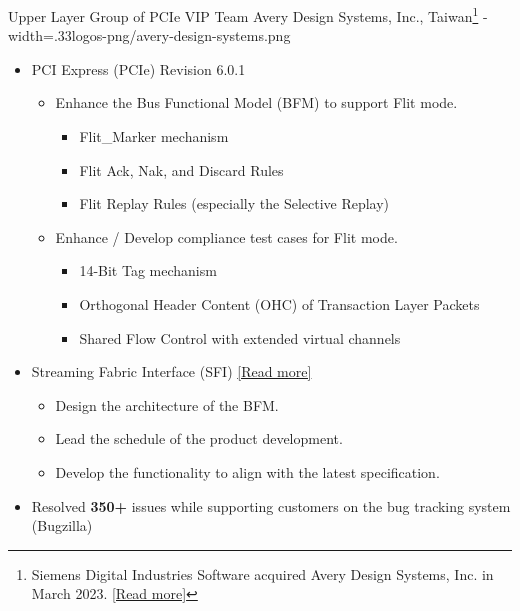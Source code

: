 \documentclass{cvclass}
\newcommand{\simplemmyy}[3]{\shortmmyyformat\formatdate{#3}{#2}{#1}}
\begin{document}
    {Upper Layer Group of PCIe VIP Team}
    {Avery Design Systems, Inc., Taiwan\footnote{Siemens Digital Industries Software acquired Avery Design Systems, Inc. in March 2023. \href{https://newsroom.sw.siemens.com/en-US/siemens-avery-design-systems/}{[Read more]}}}
    {\simplemmyy{2021}{7}{19} - \simplemmyy{2023}{4}{10}}
    {width=.33\linewidth}{logos-png/avery-design-systems.png}
    {\begin{itemize}
        \item PCI Express\textsuperscript{\tiny\textregistered} (PCIe) Revision 6.0.1
        \begin{itemize}
            \item Enhance the Bus Functional Model (BFM) to support Flit mode.
            \begin{itemize}
                \item Flit\_Marker mechanism
                \item Flit Ack, Nak, and Discard Rules
                \item Flit Replay Rules (especially the Selective Replay)
            \end{itemize}
            \item Enhance / Develop compliance test cases for Flit mode.
            \begin{itemize}
                \item 14-Bit Tag mechanism
                \item Orthogonal Header Content (OHC) of Transaction Layer Packets
                \item Shared Flow Control with extended virtual channels
            \end{itemize}
        \end{itemize}
        \item Streaming Fabric Interface (SFI) \href{https://cdrdv2.intel.com/v1/dl/getContent/644200}{[Read more]}
        \begin{itemize}
            \item Design the architecture of the BFM.
            \item Lead the schedule of the product development.
            \item Develop the functionality to align with the latest specification.
        \end{itemize}
        \item Resolved \textbf{350+} issues while supporting customers on the bug tracking system (Bugzilla)

\end{itemize}}
\end{document}
